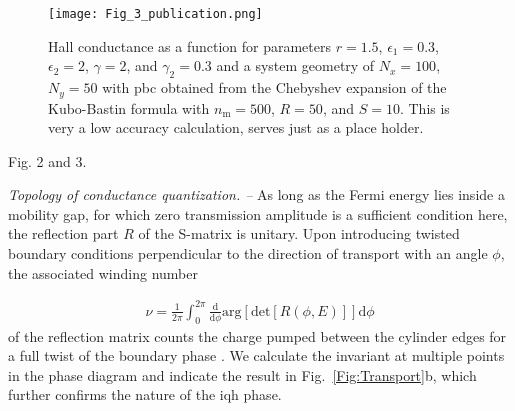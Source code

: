 \documentclass[aps,prl,amsmath,amssymb,twocolumn]{revtex4-2}
\newcommand{\JCB}[1]{{\color{green} #1}}
\newcommand{\BM}[1]{{\color{orange} #1}}
\begin{document}
\begin{figure}[htp!]	 
{\texttt{[image: Fig\_3\_publication.png]}}
\caption{Hall conductance as a function for parameters $r = 1.5$, $\epsilon_1 = 0.3$, $\epsilon_2 = 2$, $\gamma  =2$, and $\gamma_2 = 0.3$ and a system geometry of $N_x = 100$, $N_y = 50$ with \gls{pbc} obtained from the Chebyshev expansion of the Kubo-Bastin formula with $n_\mathrm{m} = 500$, $R = 50$, and $S = 10$. \BM{This is very a low accuracy calculation, serves just as a place holder.}}\label{Fig:Hall_cond}
\end{figure}

\JCB{
Fig. 2 and 3.
}

{\it Topology of conductance quantization. --} 
As long as the Fermi energy lies inside a mobility gap, for which zero transmission amplitude is a sufficient condition here, the reflection part $R$ of the S-matrix is unitary. Upon introducing twisted boundary conditions perpendicular to the direction of transport with an angle $\phi$, the associated winding number 

\begin{align}
\nu = \frac{1}{2\pi} \int_{0}^{2 \pi} \frac{\mathrm{d}}{\mathrm{d}\phi} \mathrm{arg}[\mathrm{det}[R(\phi, E)]] \mathrm{d} \phi \label{Eqn:W_num}
\end{align}
of the reflection matrix counts the charge pumped between the cylinder edges for a full twist of the boundary phase \cite{Scattering_invariants}. We calculate the invariant at multiple points in the phase diagram and indicate the result in Fig.~\ref{Fig:Transport}b, which further confirms the nature of the \gls{iqh} phase. 
\end{document}
